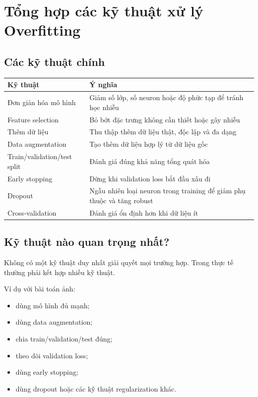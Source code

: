 \section{Tổng hợp các kỹ thuật xử lý Overfitting}

\subsection{Các kỹ thuật chính}

\begin{center}
\begin{tabular}{p{}p{}}
\toprule
Kỹ thuật & Ý nghĩa \\
\midrule
Đơn giản hóa mô hình & Giảm số lớp, số neuron hoặc độ phức tạp để tránh học nhiễu \\
Feature selection & Bỏ bớt đặc trưng không cần thiết hoặc gây nhiễu \\
Thêm dữ liệu & Thu thập thêm dữ liệu thật, độc lập và đa dạng \\
Data augmentation & Tạo thêm dữ liệu hợp lý từ dữ liệu gốc \\
Train/validation/test split & Đánh giá đúng khả năng tổng quát hóa \\
Early stopping & Dừng khi validation loss bắt đầu xấu đi \\
Dropout & Ngẫu nhiên loại neuron trong training để giảm phụ thuộc và tăng robust \\
Cross-validation & Đánh giá ổn định hơn khi dữ liệu ít \\
\bottomrule
\end{tabular}
\end{center}

\subsection{Kỹ thuật nào quan trọng nhất?}

Không có một kỹ thuật duy nhất giải quyết mọi trường hợp. Trong thực tế thường phải kết hợp nhiều kỹ thuật.

Ví dụ với bài toán ảnh:

\begin{itemize}
    \item dùng mô hình đủ mạnh;
    \item dùng data augmentation;
    \item chia train/validation/test đúng;
    \item theo dõi validation loss;
    \item dùng early stopping;
    \item dùng dropout hoặc các kỹ thuật regularization khác.
\end{itemize}

